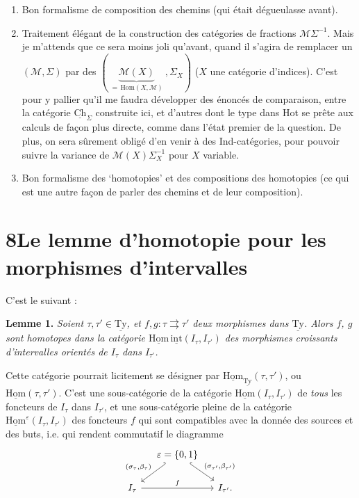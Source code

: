 \documentclass[11pt]{article}
\newcommand{\printedpage}[1]{\marginpar{\footnotesize p.~#1}}
\newcommand{\msp}[1]{\marginpar{\footnotesize [#1]}}
\newcommand{\uTy}{\underline{\mathrm{Ty}}}
\newcommand{\Ch}{\underline{\mathrm{Ch}}}
\newcommand{\Ty}{\underline{\mathrm{Ty}}}
\newcommand{\Hom}{\mathrm{Hom}}
\newcommand{\uHom}{\underline{\mathrm{Hom}}}
\begin{document}
\begin{enumerate}
\item[a)] Bon formalisme de composition des chemins (qui était dégueulasse avant).

\item[b)] Traitement élégant de la construction des catégories de fractions $\mathcal{M}\Sigma^{-1}$. Mais je m'attends que ce sera moins joli qu'avant, quand il s'agira de remplacer un $(\mathcal{M},\Sigma)$ par des $(\ \underbrace{\mathcal{M}(X)}_{=\,\Hom(X,\mathcal{M})}\ ,\Sigma_X)$ ($X$ une catégorie d'indices). C'est pour y pallier qu'il me faudra développer des énoncés de comparaison, entre la catégorie $\Ch_{\Sigma}$ construite ici, et d'autres dont le type dans Hot se prête aux calculs de façon plus directe, comme dans l'état premier de la question. De plus, on sera sûrement obligé d'en venir à des Ind-catégories, pour pouvoir suivre la variance de $\mathcal{M}(X)\Sigma_X^{-1}$ pour $X$ variable.

\item[c)] Bon formalisme des `homotopies' et des compositions des homotopies (ce qui est une autre façon de parler des chemins et de leur composition).
\end{enumerate}

\printedpage{54}

\msp{page 83}

\section*{8\quad Le lemme d'homotopie pour les morphismes d'intervalles}

C'est le suivant :

\textbf{Lemme 1.} \textit{Soient $\tau,\tau'\in\Ty$, et $f,g:\tau\rightrightarrows\tau'$ deux morphismes dans $\uTy$. Alors $f$, $g$ sont homotopes dans la catégorie $\uHom\,\underline{\mathrm{int}}(I_\tau,I_{\tau'})$ des morphismes croissants d'intervalles orientés de $I_\tau$ dans $I_{\tau'}$.}

Cette catégorie pourrait licitement se désigner par $\uHom_{\uTy}(\tau,\tau')$, ou $\uHom(\tau,\tau')$. C'est une sous-catégorie de la catégorie $\uHom(I_\tau,I_{\tau'})$ de \textit{tous} les foncteurs de $I_\tau$ dans $I_{\tau'}$, et une sous-catégorie pleine de la catégorie $\uHom^\varepsilon(I_\tau,I_{\tau'})$ des foncteurs $f$ qui sont compatibles avec la donnée des sources et des buts, i.e. qui rendent commutatif le diagramme
\[
\begin{tikzcd}[column sep=small]
 & \varepsilon=\{0,1\} \arrow[dl, hook', "{(\sigma_\tau,\beta_\tau)}"'] \arrow[dr, hook, "{(\sigma_{\tau'},\beta_{\tau'})}"] & \\
I_\tau \arrow[rr, "f"] & & I_{\tau'}.
\end{tikzcd}
\]
\end{document}
